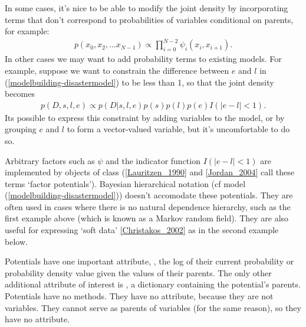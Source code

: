 \documentclass[letterpaper,10pt,english]{sphinxmanual}
\begin{document}
In some cases, it's nice to be able to modify the joint density by incorporating terms that don't correspond to probabilities of variables conditional on parents, for example:
\begin{eqnarray*}
    p(x_0, x_2, \ldots x_{N-1}) \propto \prod_{i=0}^{N-2} \psi_i(x_i, x_{i+1}).
\end{eqnarray*}
In other cases we may want to add probability terms to existing models. For example, suppose we want to constrain the difference between $e$ and $l$ in (\eqref{modelbuilding-disastermodel}) to be less than 1, so that the joint density becomes
\begin{eqnarray*}
    p(D,s,l,e) \propto p(D|s,l,e) p(s) p(l) p(e) I(|e-l|<1).
\end{eqnarray*}
Its possible to express this constraint by adding variables to the model, or by grouping $e$ and $l$ to form a vector-valued variable, but it's uncomfortable to do so.

Arbitrary factors such as $\psi$ and the indicator function $I(|e-l|<1)$ are implemented by objects of class  ({\hyperref[references:lauritzen-1990]{{[}Lauritzen\_1990{]}}} and {\hyperref[references:jordan-2004]{{[}Jordan\_2004{]}}} call these terms `factor potentials'). Bayesian hierarchical notation (cf model (\eqref{modelbuilding-disastermodel})) doesn't accomodate these potentials. They are often used in cases where there is no natural dependence hierarchy, such as the first example above (which is known as a Markov random field). They are also useful for expressing `soft data' {\hyperref[references:christakos-2002]{{[}Christakos\_2002{]}}} as in the second example below.

Potentials have one important attribute, , the log of their current probability or probability density value given the values of their parents. The only other additional attribute of interest is , a dictionary containing the potential's parents. Potentials have no methods. They have no  attribute, because they are not variables. They cannot serve as parents of variables (for the same reason), so they have no  attribute.
\end{document}
